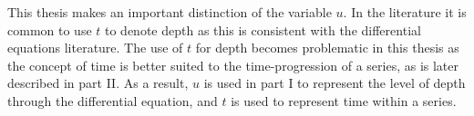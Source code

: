 This thesis makes an important distinction of the variable $u$. In the literature it is common to use $t$ to denote depth as this is consistent with the differential equations literature. The use of $t$ for depth becomes problematic in this thesis as the concept of time is better suited to the time-progression of a series, as is later described in part II. As a result, $u$ is used in part I to represent the level of depth through the differential equation, and $t$ is used to represent time within a series.




